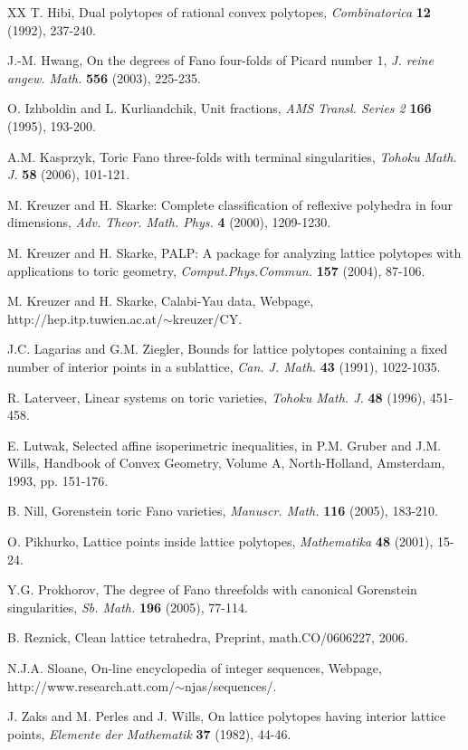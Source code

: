 \documentclass[a4paper,twoside]{article}
\begin{document}
\begin{thebibliography}{XX}
 T. Hibi, Dual polytopes of rational convex polytopes, \textit{Combinatorica} \textbf{12} (1992), 237-240.

 J.-M. Hwang, On the degrees of Fano four-folds of Picard number 1, \textit{J. reine angew. Math.} \textbf{556} (2003), 225-235.

 O. Izhboldin and L. Kurliandchik, Unit fractions,  \textit{AMS Transl. Series 2} 
\textbf{166} (1995), 193-200.

 A.M. Kasprzyk, Toric Fano three-folds with terminal singularities, \textit{Tohoku Math. J.} \textbf{58} (2006), 101-121.

 M. Kreuzer and H. Skarke:  Complete classification
of reflexive polyhedra in four dimensions, \textit{Adv. Theor. Math. Phys.} \textbf{4} (2000), 1209-1230.

 M. Kreuzer and H. Skarke, PALP: A package for analyzing lattice polytopes with 
applications to toric geometry, \textit{Comput.Phys.Commun.} \textbf{157} (2004), 87-106.

 M. Kreuzer and H. Skarke, Calabi-Yau data, 
Webpage,  http://hep.itp.\linebreak tuwien.ac.at/$\sim$kreuzer/CY.

 J.C. Lagarias and G.M. Ziegler,  Bounds for lattice polytopes containing a fixed 
number of interior points in a sublattice,  \textit{Can. J. Math.} \textbf{43} (1991), 1022-1035.

 R. Laterveer, Linear systems on toric varieties,  
\textit{Tohoku Math. J.} \textbf{48} (1996), 451-458.

 E. Lutwak, Selected affine isoperimetric inequalities, in 
P.M. Gruber and J.M. Wills, Handbook of Convex Geometry, Volume A, North-Holland, Amsterdam, 1993, pp. 151-176.

 B. Nill, Gorenstein toric Fano varieties,  \textit{Manuscr. Math.} \textbf{116} (2005), 183-210.

 O. Pikhurko, Lattice points inside lattice polytopes, \textit{Mathematika} \textbf{48} (2001), 15-24.

 Y.G. Prokhorov, The degree of Fano threefolds with canonical Gorenstein singularities, \textit{Sb. Math.} \textbf{196} (2005), 77-114.

 B. Reznick, Clean lattice tetrahedra, Preprint, math.CO/0606227, 2006.

 N.J.A. Sloane, On-line encyclopedia of integer sequences, 
Webpage, http://www.research.att.com/$\sim$njas/sequences/.

 J. Zaks and M. Perles and J. Wills, On lattice polytopes having interior lattice points,  
\textit{Elemente der Mathematik} \textbf{37} (1982), 44-46.

\end{thebibliography}
\end{document}
